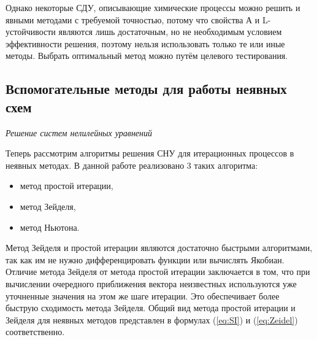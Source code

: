 


Однако некоторые СДУ, описывающие химические процессы можно решить и явными методами с требуемой точностью, потому что свойства А и
L-устойчивости являются
лишь достаточным, но не необходимым условием эффективности решения, поэтому нельзя использовать только те или иные методы. Выбрать
оптимальный метод можно путём целевого тестирования.

\subsection{Вспомогательные методы для работы неявных схем}

\textit{Решение систем нелилейных уравнений}

Теперь рассмотрим алгоритмы решения СНУ для итерационных процессов в неявных методах. В данной работе
реализовано 3 таких алгоритма:
\begin{itemize}
    \item метод простой итерации,
    \item метод Зейделя,
    \item метод Ньютона.
\end{itemize}

Метод Зейделя и простой итерации являются достаточно быстрыми алгоритмами, так как им не нужно дифференцировать функции или
вычислять Якобиан. Отличие метода Зейделя от метода простой итерации заключается в том, что при вычислении очередного приближения
вектора неизвестных используются уже уточненные значения на этом же шаге итерации. Это обеспечивает более быструю сходимость метода
Зейделя. Общий вид метода простой итерации и Зейделя для неявных методов представлен в формулах (\ref{eq:SI}) и (\ref{eq:Zeidel})
соответственно.

